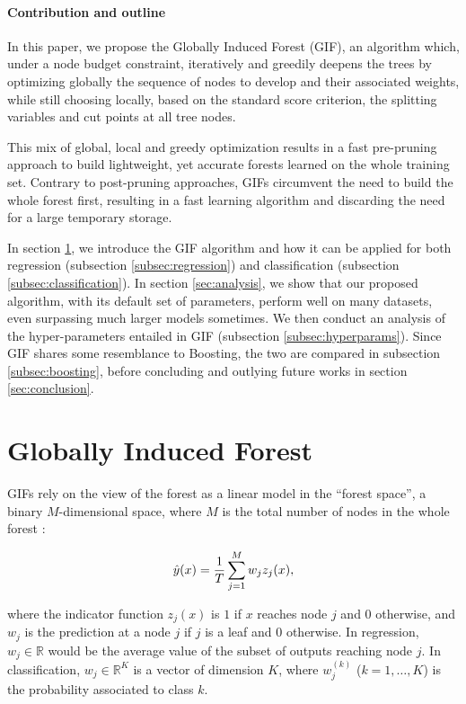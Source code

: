 \documentclass{article}
\begin{document}
\paragraph{Contribution and outline}
In this paper, we propose the Globally Induced Forest (GIF), an algorithm 
which, under a node budget constraint, iteratively and greedily deepens the 
trees by optimizing globally the sequence of nodes to develop and their 
associated weights, while still choosing locally, based on the standard score 
criterion, the splitting variables and cut points at all tree nodes. 

This mix of global, local and greedy optimization results in a fast pre-pruning 
approach to build lightweight, yet accurate forests learned on the whole 
training set. Contrary to post-pruning approaches, GIFs circumvent the need to 
build the whole forest first, resulting in a fast learning algorithm and 
discarding the need for a large temporary storage.

In section \ref{sec:gif}, we introduce the GIF algorithm and how it can be 
applied for both regression (subsection \ref{subsec:regression}) and 
classification (subsection \ref{subsec:classification}). 
In section \ref{sec:analysis}, we show that our proposed algorithm, with its 
default set of parameters, perform well on many datasets, even surpassing much 
larger models sometimes. We then conduct an analysis of the hyper-parameters 
entailed in GIF (subsection \ref{subsec:hyperparams}). Since GIF shares some 
resemblance to Boosting, the two are compared in subsection 
\ref{subsec:boosting}, before concluding and outlying future works in section 
\ref{sec:conclusion}. 


\section{Globally Induced Forest}
\label{sec:gif}

GIFs rely on the view of the forest as a linear model in the ``forest space'', 
a binary $M$-dimensional space, where $M$ is the total number of nodes in the 
whole forest \cite{l1basedcomp}:

\begin{equation}\label{eq:fs}
\vspace{-1em}
\hat{y}(x) =  \frac{1}{T} \sum_{j=1}^{M} w_j z_j(x),
\end{equation}

where the indicator function $z_j(x)$ is $1$ if $x$ reaches node $j$
and $0$ otherwise, and $w_j$ is the prediction at a node $j$ if $j$ is
a leaf and $0$ otherwise. In regression, $w_j \in \mathbb{R}$ would be the 
average value of the subset of outputs reaching node $j$. In classification, 
$w_j \in \mathbb{R}^K$ is a vector of dimension $K$, where $w_j^{(k)}$ 
($k=1,\ldots,K$) is the probability associated to class $k$.
\end{document}
